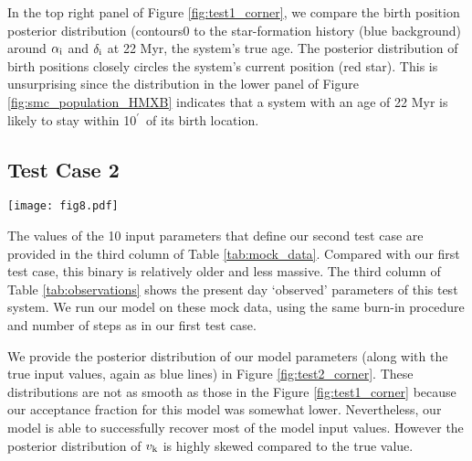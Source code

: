 \documentclass[usenatbib]{mnras}
\newcommand{\amin}{\ifmmode {^{\prime}\ }\else$^{\prime}$\fi}
\begin{document}
In the top right panel of Figure \ref{fig:test1_corner}, we compare the birth position posterior distribution (contours0 to the star-formation history (blue background) around $\alpha_{\rm i}$ and $\delta_{\rm i}$ at 22 Myr, the system's true age. The posterior distribution of birth positions closely circles the system's current position (red star). This is unsurprising since the distribution in the lower panel of Figure \ref{fig:smc_population_HMXB} indicates that a system with an age of 22 Myr is likely to stay within 10\amin\ of its birth location.


\subsection{Test Case 2} \label{sec:test2}

\begin{figure*}
\begin{center}
\texttt{[image: fig8.pdf]}
\caption{Posterior probability distributions and their covariances when applied to test case 2. As in Figure \ref{fig:test1_corner}, the true input values are indicated by the blue lines in each plot. Our model again successfully reproduces all of these parameters. As in Figure \ref{fig:test1_corner} the top right panel compares the star-formation rate (blue background) with the posterior distribution of birth positions (black contours). Again, the posterior birth position distribution roughly follows the region of high star-formation. The model correctly identifies that the system's birth position is at somewhat smaller declinations than its current position, indicated by the red star in the top right panel.}
\label{fig:test2_corner}
\end{center}
\end{figure*}

The values of the 10 input parameters that define our second test case are provided in the third column of Table \ref{tab:mock_data}. Compared with our first test case, this binary is relatively older and less massive. The third column of Table \ref{tab:observations} shows the present day `observed' parameters of this test system. We run our model on these mock data, using the same burn-in procedure and number of steps as in our first test case.

We provide the posterior distribution of our model parameters (along with the true input values, again as blue lines) in Figure \ref{fig:test2_corner}. These distributions are not as smooth as those in the Figure \ref{fig:test1_corner} because our acceptance fraction for this model was somewhat lower. Nevertheless, our model is able to successfully recover most of the model input values. However the posterior distribution of $v_{\rm k}$ is highly skewed compared to the true value. 
\end{document}
